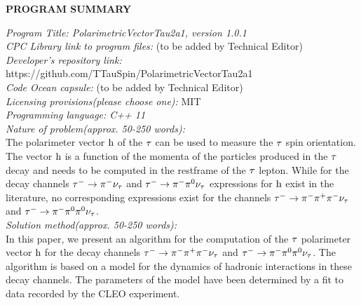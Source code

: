 \ifx\ver\verPAPER
{\bf PROGRAM SUMMARY} \\
\begin{small}
\noindent
{\em Program Title: PolarimetricVectorTau2a1, version 1.0.1} \\
{\em CPC Library link to program files:} (to be added by Technical Editor) \\
{\em Developer's repository link:} https://github.com/TTauSpin/PolarimetricVectorTau2a1 \\
{\em Code Ocean capsule:} (to be added by Technical Editor)\\
{\em Licensing provisions(please choose one):} 
MIT \\
{\em Programming language: C++ 11} \\
{\em Nature of problem(approx. 50-250 words):}\\
  The polarimeter vector $\textrm{h}$ of the $\tau$ can be used to measure the $\tau$ spin orientation.
  The vector $\textrm{h}$ is a function of the momenta of the particles produced in the $\tau$ decay and needs to be computed in the restframe of the $\tau$ lepton. 
  While for the decay channels $\tau^{-} \to \pi^{-}\nu_{\tau}$ and $\tau^{-} \to \pi^{-}\pi^{\textrm{0}}\nu_{\tau}$ expressions for $\textrm{h}$ exist in the literature,
  no corresponding expressions exist for the channels $\tau^{-} \to \pi^{-}\pi^{+}\pi^{-}\nu_{\tau}$ and $\tau^{-} \to \pi^{-}\pi^{\textrm{0}}\pi^{\textrm{0}}\nu_{\tau}$. \\
{\em Solution method(approx. 50-250 words):}\\
  In this paper, we present an algorithm for the computation of the $\tau$ polarimeter vector $\textrm{h}$ for the decay channels $\tau^{-} \to \pi^{-}\pi^{+}\pi^{-}\nu_{\tau}$ and $\tau^{-} \to \pi^{-}\pi^{\textrm{0}}\pi^{\textrm{0}}\nu_{\tau}$.
  The algorithm is based on a model for the dynamics of hadronic interactions in these decay channels.
  The parameters of the model have been determined by a fit to data recorded by the CLEO experiment.
   \\
\end{small}   
\fi


